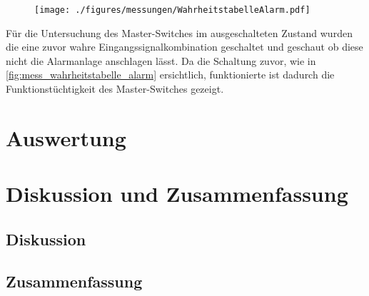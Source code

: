 \documentclass[12pt,english,ngerman]{scrartcl}
\begin{document}
\begin{figure}[H]
  \centering
    \texttt{[image: ./figures/messungen/WahrheitstabelleAlarm.pdf]}
  \caption{}
  \label{fig:mess_wahrheitstabelle_alarm}
\end{figure}

Für die Untersuchung des Master-Switches im ausgeschalteten Zustand wurden die
eine zuvor wahre Eingangssignalkombination geschaltet und geschaut ob diese
nicht die Alarmanlage anschlagen lässt. Da die Schaltung zuvor, wie in
\autoref{fig:mess_wahrheitstabelle_alarm} ersichtlich, funktionierte ist
dadurch die Funktionstüchtigkeit des Master-Switches gezeigt.


\section{Auswertung}\label{sec:Auswertung}


\section{Diskussion und Zusammenfassung}\label{sec:Diskussion} 
\subsection{Diskussion}


\subsection{Zusammenfassung}

\newpage

\printbibliography

\listoffigures

\listoftables
\end{document}
